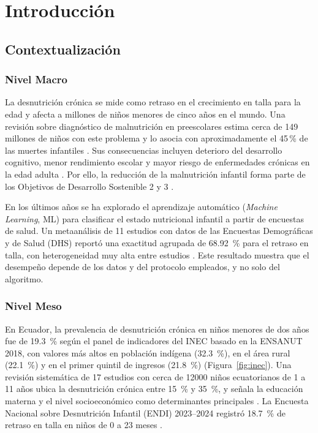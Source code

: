 \chapter{Introducción}

\section{Contextualización}

\subsection{Nivel Macro}
La desnutrición crónica se mide como retraso en el crecimiento en talla para la edad y afecta a millones de niños menores de cinco años en el mundo. Una revisión sobre diagnóstico de malnutrición en preescolares estima cerca de 149 millones de niños con este problema y lo asocia con aproximadamente el 45\,\% de las muertes infantiles \cite{shindediagnosing}. Sus consecuencias incluyen deterioro del desarrollo cognitivo, menor rendimiento escolar y mayor riesgo de enfermedades crónicas en la edad adulta \cite{nu17101642}. Por ello, la reducción de la malnutrición infantil forma parte de los Objetivos de Desarrollo Sostenible 2 y 3 \cite{11355002}.

En los últimos años se ha explorado el aprendizaje automático (\textit{Machine Learning}, ML) para clasificar el estado nutricional infantil a partir de encuestas de salud. Un metaanálisis de 11 estudios con datos de las Encuestas Demográficas y de Salud (DHS) reportó una exactitud agrupada de \SI{68.92}{\percent} para el retraso en talla, con heterogeneidad muy alta entre estudios \cite{ijerph22030449}. Este resultado muestra que el desempeño depende de los datos y del protocolo empleados, y no solo del algoritmo.

\subsection{Nivel Meso}
En Ecuador, la prevalencia de desnutrición crónica en niños menores de dos años fue de \SI{19.3}{\percent} según el panel de indicadores del INEC basado en la ENSANUT 2018, con valores más altos en población indígena (\SI{32.3}{\percent}), en el área rural (\SI{22.1}{\percent}) y en el primer quintil de ingresos (\SI{21.8}{\percent}) (Figura~\ref{fig:inec}). Una revisión sistemática de 17 estudios con cerca de \num{12000} niños ecuatorianos de 1 a 11 años ubica la desnutrición crónica entre \SI{15}{\percent} y \SI{35}{\percent}, y señala la educación materna y el nivel socioeconómico como determinantes principales \cite{nu17223608}. La Encuesta Nacional sobre Desnutrición Infantil (ENDI) 2023--2024 registró \SI{18.7}{\percent} de retraso en talla en niños de 0 a 23 meses \cite{nu18142232}.

